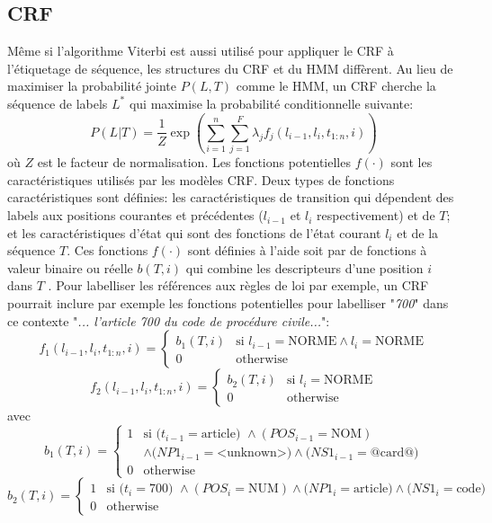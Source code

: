 \subsection{CRF}
\label{sec:structuration:biblio:CRF}

Même si l'algorithme Viterbi est aussi utilisé pour appliquer le CRF à l'étiquetage de séquence, les structures du CRF et du HMM diffèrent. Au lieu de maximiser la probabilité jointe $ P(L, T)$ comme le HMM, un CRF \citep{lafferty2001crfie} cherche la séquence de labels $L^*$ qui maximise la probabilité conditionnelle suivante: $$P(L|T) = \frac{1}{Z}\exp \left(\sum\limits_{i=1}^n\sum\limits_{j=1}^F \lambda_j f_j(l_{i-1},l_i,t_{1:n},i)\right)$$ où $Z$ est le facteur de normalisation. Les fonctions potentielles $f(\cdot)$ sont les caractéristiques utilisés par les modèles CRF. Deux types de fonctions caractéristiques sont définies: les caractéristiques de transition qui dépendent des labels aux positions courantes et précédentes ($l_{i-1}$ et $ l_{i}$ respectivement) et de $T$; et les caractéristiques d'état qui sont des fonctions de l'état courant $ l_{i} $ et de la séquence $ T $. Ces fonctions $f(\cdot)$ sont définies à l'aide soit par de fonctions à valeur binaire ou réelle $b(T,i)$ qui combine les descripteurs d'une position $i$ dans $T$ \citep{Wallach2004crfintro}. Pour labelliser les références aux règles de loi par exemple, un CRF pourrait inclure par exemple les fonctions potentielles pour labelliser "\textit{700}" dans ce contexte "\textit{... l'article 700 du code de procédure civile...}":
{%
\[f_1(l_{i-1},l_i,t_{1:n},i) = \left\lbrace \begin{array}{ll}
b_1(T,i) & \text{si } l_{i-1} = \text{NORME} \wedge l_i = \text{NORME} \\
0 & \text{otherwise}
\end{array} \right.\]
\[f_2(l_{i-1},l_i,t_{1:n},i) = \left\lbrace \begin{array}{ll}
b_2(T,i) & \text{si }l_i = \text{NORME} \\
0 & \text{otherwise}
\end{array} \right.\]
avec
\[b_1(T,i) = \left\lbrace \begin{array}{ll}
1 & \text{si } (t_{i-1} =\text{article) }\wedge (POS_{i-1}=\text{NOM}) \\&  \wedge  (NP1_{i-1}=\text{<unknown>)} \wedge (NS1_{i-1}=\text{@card@)} \\
0 & \text{otherwise} 
\end{array} \right.\]
\[b_2(T,i) = \left\lbrace \begin{array}{ll}
1 & \text{si } (t_i =\text{700) }\wedge (POS_i=\text{NUM})  \wedge (NP1_i=\text{article)} 
\wedge (NS1_i=\text{code)} \\
0 & \text{otherwise}
\end{array} \right.\]
}
